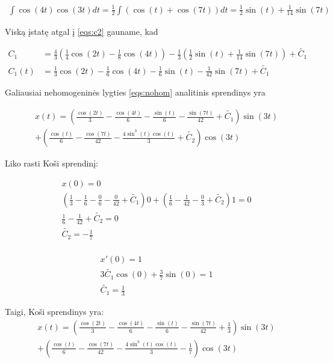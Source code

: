 \documentclass[11pt]{article}
\begin{document}
\begin{align*}
\int\cos(4t)\cos(3t)dt=
\frac{1}{2}\int(\cos(t)+\cos(7t))dt=
\frac{1}{2}\sin(t)+\frac{1}{14}\sin(7t)
\end{align*}

Viską įstatę atgal į \eqref{eqs:c2} gauname, kad

\begin{align*}
C_1&=\frac{4}{3}\left(\frac{1}{4}\cos(2t)-\frac{1}{8}\cos(4t)\right)-\frac{1}{3}\left(\frac{1}{2}\sin(t)+\frac{1}{14}\sin(7t)\right)+\tilde{C_1}\\
C_1(t)&=\frac{1}{3}\cos(2t)-\frac{1}{6}\cos(4t)-\frac{1}{6}\sin(t)-\frac{1}{42}\sin(7t)+\tilde{C_1}
\end{align*}

Galiausiai nehomogeninės lygties \eqref{eqs:nohom} analitinis sprendinys yra

\begin{align}
x(t)=
\left(\frac{\cos(2t)}{3}-\frac{\cos(4t)}{6}-\frac{\sin(t)}{6}-\frac{\sin(7t)}{42}+\tilde{C_1}\right)\sin(3t)\\
+\left(\frac{\cos(t)}{6}-\frac{\cos(7t)}{42}-\frac{4\sin^3(t)\cos(t)}{3}+\tilde{C_2}\right)\cos(3t)
\end{align}

Liko rasti Koši sprendinį:

\begin{align*}
x(0)=0\\
\left(\frac{1}{3}-\frac{1}{6}-\frac{0}{6}-\frac{0}{42}+\tilde{C_1}\right)0
+\left(\frac{1}{6}-\frac{1}{42}-\frac{0}{3}+\tilde{C_2}\right)1=0\\
\frac{1}{6}-\frac{1}{42}+\tilde{C_2}=0\\
\tilde{C_2}=-\frac{1}{7}\\
\end{align*}

\begin{align*}
x'(0)=1\\
3\tilde{C_1}\cos(0)+\frac{3}{7}\sin(0)=1\\
\tilde{C_1}=\frac{1}{3}
\end{align*}

Taigi, Koši sprendinys yra:
\begin{align*}
x(t)=
\left(\frac{\cos(2t)}{3}-\frac{\cos(4t)}{6}-\frac{\sin(t)}{6}-\frac{\sin(7t)}{42}+\frac{1}{3}\right)\sin(3t)\\
+\left(\frac{\cos(t)}{6}-\frac{\cos(7t)}{42}-\frac{4\sin^3(t)\cos(t)}{3}-\frac{1}{7}\right)\cos(3t)
\end{align*}
\end{document}
